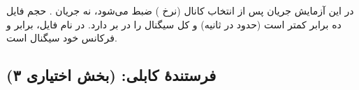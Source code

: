 \documentclass[a4paper,11pt]{article}
\begin{document}
\begin{notebox}
در این آزمایش جریان
\IQ{}
پس از انتخاب کانال (نرخ
)
ضبط می‌شود، نه جریان
.
حجم فایل ده برابر کمتر است (حدود
در ثانیه) و کل سیگنال
را در بر دارد. در نام فایل،
برابر
و
فرکانس خود سیگنال است.
\end{notebox}

\subsection{فرستندهٔ کابلی:  (بخش اختیاری ۳)}
\end{document}

